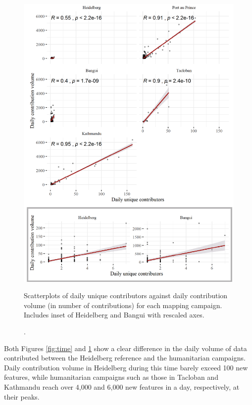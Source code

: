 \begin{figure} %
    \centering %
    \includegraphics[width = \textwidth]{Images/scatter_inset.png} %
    \caption[Scatterplots of daily unique contributors against daily contribution volume].{Scatterplots of daily unique contributors against daily contribution volume (in number of contributions) for each mapping campaign. Includes inset of Heidelberg and Bangui with rescaled axes.} %
    \label{fig:scatter} %
\end{figure}

Both Figures \ref{fig:time} and \ref{fig:scatter} show a clear difference in the daily volume of data contributed between the Heidelberg reference and the humanitarian campaigns.  Daily contribution volume in Heidelberg during this time barely exceed 100 new features, while humanitarian campaigns such as those in Tacloban and Kathmandu reach over 4,000 and 6,000 new features in a day, respectively, at their peaks. 

